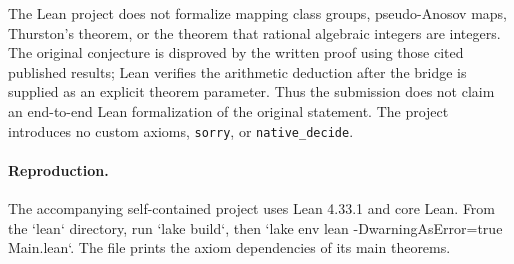 \documentclass[11pt]{article}
\begin{document}
The Lean project does not formalize mapping class groups, pseudo-Anosov maps, Thurston's theorem, or the theorem that rational algebraic integers are integers. The original conjecture is disproved by the written proof using those cited published results; Lean verifies the arithmetic deduction after the bridge is supplied as an explicit theorem parameter. Thus the submission does not claim an end-to-end Lean formalization of the original statement. The project introduces no custom axioms, \texttt{sorry}, or \texttt{native\_decide}.

\paragraph{Reproduction.} The accompanying self-contained project uses Lean 4.33.1 and core Lean. From the `lean` directory, run `lake build`, then `lake env lean -DwarningAsError=true Main.lean`. The file prints the axiom dependencies of its main theorems.
\end{document}
